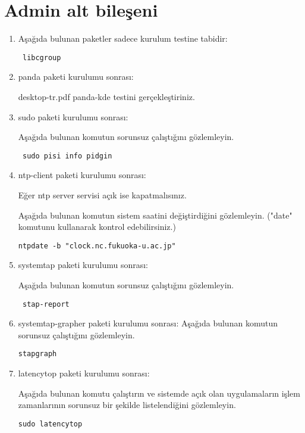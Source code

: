 \documentclass[a4paper,10pt]{article}
\begin{document}
\section{Admin alt bileşeni}
\begin{enumerate}

\item Aşağıda bulunan paketler sadece kurulum testine tabidir:

\begin{verbatim}
 libcgroup
\end{verbatim}

\item panda paketi kurulumu sonrası:

desktop-tr.pdf panda-kde testini gerçekleştiriniz.

\item sudo paketi kurulumu sonrası:

Aşağıda bulunan komutun sorunsuz çalıştığını gözlemleyin.
\begin{verbatim}
 sudo pisi info pidgin
\end{verbatim}

\item ntp-client paketi kurulumu sonrası:

Eğer ntp server servisi açık ise kapatmalısınız. 

Aşağıda bulunan komutun sistem saatini değiştirdiğini gözlemleyin.  ("date" komutunu kullanarak kontrol edebilirsiniz.)
\begin{verbatim}
ntpdate -b "clock.nc.fukuoka-u.ac.jp" 
\end{verbatim}

\item systemtap paketi kurulumu sonrası:

Aşağıda bulunan komutun sorunsuz çalıştığını gözlemleyin.
\begin{verbatim}
 stap-report
\end{verbatim}

\item systemtap-grapher paketi kurulumu sonrası:
Aşağıda bulunan komutun sorunsuz çalıştığını gözlemleyin.
\begin{verbatim}
stapgraph
\end{verbatim}


\item latencytop paketi kurulumu sonrası:

Aşağıda bulunan komutu çalıştırın ve sistemde açık olan uygulamaların işlem zamanlarının sorunsuz bir şekilde listelendiğini gözlemleyin.
\begin{verbatim}
sudo latencytop 
\end{verbatim}


\end{enumerate}
\end{document}
